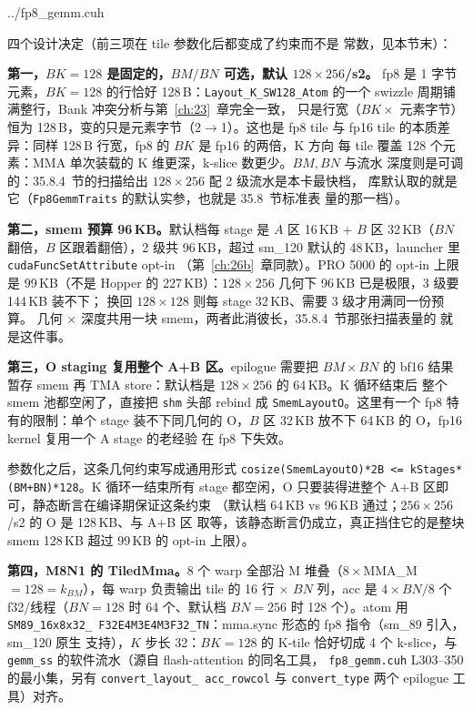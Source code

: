 \begin{lstinputlisting}[linerange={366-400},firstnumber=auto,
  title={fp8\_gemm.cuh L366-400（Fp8GemmTraits：tile/smem/MMA 全参数）}]{../fp8_gemm.cuh}
\end{lstinputlisting}

四个设计决定（前三项在 tile 参数化后都变成了约束而不是
常数，见本节末）：

\textbf{第一，$BK{=}128$ 是固定的，$BM/BN$ 可选，默认 $128\times256$/s2。}
fp8 是 1 字节元素，$BK{=}128$ 的行恰好 128\,B：\texttt{Layout\_K\_SW128\_Atom}
的一个 swizzle 周期铺满整行，Bank 冲突分析与第~\ref{ch:23}~章完全一致，
只是行宽（$BK\times$ 元素字节）恒为 128\,B，变的只是元素字节（2$\to$1）。这也是 fp8 tile 与
fp16 tile 的本质差异：同样 128\,B 行宽，fp8 的 $BK$ 是 fp16 的两倍，K 方向
每 tile 覆盖 128 个元素：MMA 单次装载的 K 维更深，k-slice 数更少。$BM,BN$ 与流水
深度则是可调的：35.8.4~节的扫描给出 $128\times256$ 配 2 级流水是本卡最快档，
库默认取的就是它（\texttt{Fp8GemmTraits} 的默认实参，也就是 35.8~节标准表
量的那一档）。

\textbf{第二，smem 预算 96\,KB。}默认档每 stage 是 $A$ 区 16\,KB + $B$ 区
32\,KB（$BN$ 翻倍，$B$ 区跟着翻倍），2 级共 96\,KB，超过 sm\_120 默认的
48\,KB，launcher 里 \texttt{cudaFuncSetAttribute} opt-in
（第~\ref{ch:26b}~章同款）。PRO 5000 的 opt-in 上限是 99\,KB（不是 Hopper 的
227\,KB）：$128\times256$ 几何下 96\,KB 已是极限，3 级要 144\,KB 装不下；
换回 $128\times128$ 则每 stage 32\,KB、需要 3 级才用满同一份预算。
几何 $\times$ 深度共用一块 smem，两者此消彼长，35.8.4~节那张扫描表量的
就是这件事。

\textbf{第三，O staging 复用整个 A+B 区。}epilogue 需要把
$BM\times BN$ 的 bf16 结果暂存 smem 再 TMA store：默认档是
$128\times256$ 的 64\,KB。K 循环结束后
整个 smem 池都空闲了，直接把 \texttt{shm} 头部 rebind 成
\texttt{SmemLayoutO}。这里有一个 fp8 特有的限制：单个 stage 装不下同几何的
O，$B$ 区 32\,KB 放不下 64\,KB 的 O，fp16 kernel 复用一个 A stage 的老经验
在 fp8 下失效。

参数化之后，这条几何约束写成通用形式
\texttt{cosize(SmemLayoutO)*2B <= kStages*(BM+BN)*128}。K 循环一结束所有
stage 都空闲，O 只要装得进整个 A+B 区即可，静态断言在编译期保证这条约束
（默认档 64\,KB vs 96\,KB 通过；$256\times256$/s2 的 O 是 128\,KB、与 A+B 区
取等，该静态断言仍成立，真正挡住它的是整块 smem 128\,KB 超过 99\,KB 的
opt-in 上限）。

\textbf{第四，M8N1 的 TiledMma。}8 个 warp 全部沿 M 堆叠（$8\times$MMA\_M
$=128=k_{BM}$），每 warp 负责输出 tile 的 16 行 $\times$ $BN$ 列，acc 是
$4\times BN/8$ 个 f32/线程（$BN{=}128$ 时 64 个、默认档 $BN{=}256$ 时
128 个）。atom 用 \texttt{SM89\_16x8x32\_
F32E4M3E4M3F32\_TN}：mma.sync 形态的 fp8 指令（sm\_89 引入，sm\_120 原生
支持），$K$ 步长 32：$BK{=}128$ 的 K-tile 恰好切成 4 个 k-slice，与
\texttt{gemm\_ss} 的软件流水（源自 flash-attention 的同名工具，
\texttt{fp8\_gemm.cuh} L303--350 的最小集，另有 \texttt{convert\_layout\_
acc\_rowcol} 与 \texttt{convert\_type} 两个 epilogue 工具）对齐。

